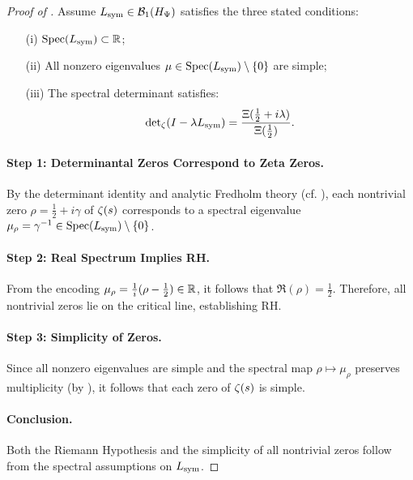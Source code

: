 \begin{proof}[Proof of ]
Assume \( L_{\mathrm{sym}} \in \mathcal{B}_1(H_{\Psi}) \) satisfies the three stated conditions:
\begin{enumerate}
  \item[\textup{(i)}] \( \operatorname{Spec}(L_{\mathrm{sym}}) \subset \mathbb{R} \);
  \item[\textup{(ii)}] All nonzero eigenvalues \( \mu \in \operatorname{Spec}(L_{\mathrm{sym}}) \setminus \{0\} \) are simple;
  \item[\textup{(iii)}] The spectral determinant satisfies:
  \[
  \det\nolimits_{\zeta}(I - \lambda L_{\mathrm{sym}}) = \frac{\Xi(\tfrac{1}{2} + i\lambda)}{\Xi(\tfrac{1}{2})}.
  \]
\end{enumerate}

\paragraph{Step 1: Determinantal Zeros Correspond to Zeta Zeros.}
By the determinant identity and analytic Fredholm theory (cf. ),
each nontrivial zero \( \rho = \tfrac{1}{2} + i\gamma \) of \( \zeta(s) \)
corresponds to a spectral eigenvalue \( \mu_\rho = \gamma^{-1} \in \operatorname{Spec}(L_{\mathrm{sym}}) \setminus \{0\} \).

\paragraph{Step 2: Real Spectrum Implies RH.}
From the encoding \( \mu_\rho = \tfrac{1}{i}(\rho - \tfrac{1}{2}) \in \mathbb{R} \),
it follows that \( \Re(\rho) = \tfrac{1}{2} \). Therefore,
all nontrivial zeros lie on the critical line, establishing RH.

\paragraph{Step 3: Simplicity of Zeros.}
Since all nonzero eigenvalues are simple and the spectral map
\( \rho \mapsto \mu_\rho \) preserves multiplicity (by ),
it follows that each zero of \( \zeta(s) \) is simple.

\paragraph{Conclusion.}
Both the Riemann Hypothesis and the simplicity of all nontrivial zeros
follow from the spectral assumptions on \( L_{\mathrm{sym}} \).
\end{proof}
